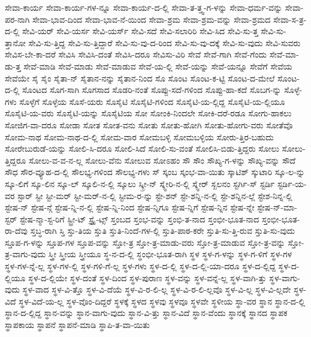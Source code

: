 {ಸೇವಾ-ಕಾರ್ಯ
ಸೇವಾ-ಕಾರ್ಯ-ಗಳ-ನ್ನೂ
ಸೇವಾ-ಕಾರ್ಯ-ದ-ಲ್ಲಿ
ಸೇವಾ-ತ-ತ್ತ್ವ-ಗ-ಳನ್ನು
ಸೇವಾ-ಧರ್ಮ-ವನ್ನು
ಸೇವಾ-ಪರ-ನಾಗಿ
ಸೇವಾ-ಭಾವ-ದಿಂದ
ಸೇವಾ-ಭಾವ-ನೆ-ಯಿಂದ
ಸೇವಾ-ಶ್ರಮ
ಸೇವಾ-ಶ್ರಮ-ವನ್ನು
ಸೇವಾ-ಶ್ರಮದ
ಸೇವಾ-ಸ-ತ್ರ-ದ-ಲ್ಲಿ
ಸೇವಿ-ಯರ್
ಸೇವಿ-ಯರ್ಸ
ಸೇವಿ-ಯರ್ಸ್
ಸೇವಿ-ಸದೆ
ಸೇವಿ-ಸಲಾರಿರಿ
ಸೇವಿ-ಸಿದ
ಸೇವಿ-ಸು-ತ್ತ
ಸೇವಿ-ಸು-ತ್ತಾನೋ
ಸೇವಿ-ಸು-ತ್ತಿದ್ದ
ಸೇವಿ-ಸು-ತ್ತಿದ್ದಾರೆ
ಸೇವಿ-ಸು-ವು-ದ-ರಿಂದ
ಸೇವಿ-ಸು-ವು-ದಕ್ಕೆ
ಸೇವಿ-ಸು-ವುದು
ಸೇವಿ-ಸುವರು
ಸೇವಿಸ-ಬೇ-ಕಾ-ದರೆ
ಸೇವಿಸಿ
ಸೇವಿಸಿ-ದಂತೆ
ಸೇವಿಸಿ-ದರೂ
ಸೇವಿಸು-ವಿರಿ
ಸೇವೆ
ಸೇವೆ-ಗಾಗಿ
ಸೇವೆ-ಗೆಂದು
ಸೇವೆ-ಮಾ-ಡು-ತ್ತ
ಸೇವೆ-ಮಾಡಿ
ಸೇವೆ-ಮಾಡು
ಸೇವೆ-ಮಾಡುವ
ಸೇವೆ-ಯ-ಲ್ಲಿ
ಸೇವೆ-ಯನ್ನು
ಸೇವೆ-ಯನ್ನೂ
ಸೇವೆಗೆ
ಸೇವೆಯ
ಸೇವೆಯೇ
ಸೈ
ಸೈಂ
ಸೈತಾ-ನ್
ಸೈತಾನ-ನನ್ನು
ಸೈತಾನ-ನಿಂದ
ಸೊ
ಸೊಂಟ
ಸೊಂಟ-ಕ-ಟ್ಟಿ
ಸೊಂಟ-ದ-ಮೇಲೆ
ಸೊಂಟ-ದ-ಲ್ಲಿ
ಸೊಂಟದ
ಸೊಗ-ಸಾಗಿ
ಸೊಗಸಾದ
ಸೊಡರಿ-ನಂತೆ
ಸೊಪ್ಪು-ಸದೆ-ಗಳಿಂದ
ಸೊಪ್ಪು-ಹಾ-ಕದೆ
ಸೊಬಗ-ನ್ನು
ಸೊಳ್ಳೆ-ಗಳು
ಸೊಳ್ಳೆಗೆ
ಸೊಳ್ಳೆಯ
ಸೊಸೆ-ಯರು
ಸೊಸೈಟಿ
ಸೊಸೈಟಿ-ಗಳಿಂದ
ಸೊಸೈಟಿ-ಯ-ಲ್ಲಿದ್ದ
ಸೊಸೈಟಿ-ಯ-ಲ್ಲಿಯೂ
ಸೊಸೈಟಿ-ಯ-ವರು
ಸೊಸೈಟಿ-ಯನ್ನು
ಸೊಸೈಟಿಯ
ಸೋ
ಸೋಂಕಿ-ನಿಂದಲೇ
ಸೋಕಿ-ದರೆ-ರಡೂ
ಸೋಗು-ಹಾಕಲು
ಸೋಜಿಗ-ವಾ-ದರೂ
ಸೋಡಾ
ಸೋತ
ಸೋತ-ವನು
ಸೋತು
ಸೋತು-ಹೋಗಿ
ಸೋತು-ಹೋಗು-ವರು
ಸೋತೆವೊ
ಸೋಮ-ನಾಥ
ಸೋಮ-ನಾಥ-ದ-ಲ್ಲಿ
ಸೋಮ-ವಾರ
ಸೋಮಬಳ್ಳಿ
ಸೋಮಬಳ್ಳಿಯ
ಸೋರು-ತ್ತಿರ-ಬಹುದು
ಸೋರೇಬುರುಡೆ-ಯನ್ನು
ಸೋಲಿ-ಸಿ-ದರೂ
ಸೋಲಿ-ಸಿದೆ
ಸೋಲಿ-ಸು-ವಂತೆ
ಸೋಲಿಸಿ-ಬಿಡು-ತ್ತಿದ್ದರು
ಸೋಲು
ಸೋಲು-ತ್ತಿದ್ದರೂ
ಸೋಲು-ವ-ವ-ನ-ಲ್ಲ
ಸೋಲು-ವೆನು
ಸೋಲುವ
ಸೋಽಹಂ
ಸೌ
ಸೌಂ
ಸೌಖ್ಯ-ಗ-ಳನ್ನು
ಸೌಖ್ಯ-ವನ್ನು
ಸೌದೆ
ಸೌಧ
ಸೌರ-ವ್ಯೂಹ-ದ-ಲ್ಲಿ
ಸೌಲಭ್ಯ-ಗಳಿಂದ
ಸೌಲಭ್ಯ-ಗಳು
ಸ್
ಸ್ಕಂಬ
ಸ್ಕಂಭ-ವಾ-ಯಿತು
ಸ್ಕಾಟಿಶ್
ಸ್ಕುಟಾರಿ
ಸ್ಕೂ-ಲ-ನ್ನು
ಸ್ಕೂ-ಲಿಗೆ
ಸ್ಕೂ-ಲಿನ
ಸ್ಕೂ-ಲ್
ಸ್ಕೂಲಿ-ನ-ಲ್ಲಿ
ಸ್ಕೂಲು
ಸ್ಕ್ರೀ-ನ್
ಸ್ಕ್ವೇರಿ-ನ-ಲ್ಲಿ
ಸ್ಕ್ವೇರ್
ಸ್ಖಲನಂ
ಸ್ಟರ್ಗಿ-ಸ್
ಸ್ಟರ್ಡಿ
ಸ್ಟರ್ಡಿ-ಯ-ವರ
ಸ್ಟಾರ್
ಸ್ಟೀ
ಸ್ಟೀ-ಮರ್
ಸ್ಟೀ-ಮರ್-ನ-ಲ್ಲಿ
ಸ್ಟೀಮ-ರ-ನ್ನು
ಸ್ಟೇ-ಶನ್
ಸ್ಟೇ-ಶನ್ನಿ-ನ-ಲ್ಲಿ
ಸ್ಟೇ-ಶನ್ನಿನ-ಲ್ಲೆ
ಸ್ಟೇಶ-ನಿನ್ನ-ಲ್ಲಿ
ಸ್ಟೇಷ-ನ್
ಸ್ಟೇಷ-ನ್ಗೆ
ಸ್ಟೇಷ-ನ್ನಿ-ನ-ಲ್ಲಿ
ಸ್ಟೇಷ-ನ್ನಿ-ನಿಂದ
ಸ್ಟೇಷ-ನ್ನಿಗೂ
ಸ್ಟೇಷ-ನ್ನಿಗೆ
ಸ್ಟೇಷ-ನ್ನಿನ
ಸ್ಟೇಷ-ನ್ನೇ
ಸ್ಟೇಷ-ನ್-ಮಾ-ಸ್ಟರ್
ಸ್ಟೇಷ-ನ್ಮಾ-ಸ್ಟ-ರಿಗೆ
ಸ್ಟ್ರೀ-ಟ್
ಸ್ಟ್ರೈ-ಟ್ಸ್
ಸ್ತಂಬದ
ಸ್ತಂಭ-ವನ್ನು
ಸ್ತಂಭಿ-ತ-ನಾದ
ಸ್ತಂಭೀ-ಭೂತ-ನಾದ
ಸ್ತಂಭೀ-ಭೂತ-ರಾ-ದೆವು
ಸ್ತಬ್ಧ-ರಾಗಿ
ಸ್ತಿ
ಸ್ತು-ತಿಯ
ಸ್ತುತಿ
ಸ್ತುತಿ-ನಿಂದೆ-ಗಳ-ಲ್ಲಿ
ಸ್ತುತಿ-ಪಾಠ-ಕರೇ
ಸ್ತುತಿ-ಸು-ತ್ತಿ-ರುವ
ಸ್ತುತಿ-ಸು-ವುದು
ಸ್ತೂಪ-ಗ-ಳನ್ನು
ಸ್ತೂಪ-ಗಳ
ಸ್ತೂಪ-ವನ್ನು
ಸ್ತೋ-ತ್ರ
ಸ್ತೋ-ತ್ರ-ಮಾಡು-ವರು
ಸ್ತೋ-ತ್ರ-ಮಾಡುವ
ಸ್ತೋ-ತ್ರ-ವನ್ನು
ಸ್ತೋ-ತ್ರ-ವಾಗು-ವುದು
ಸ್ತ್ರೀ
ಸ್ತ್ರೀಯ
ಸ್ತ್ರೀಯೂ
ಸ್ಥ-ನ-ದ-ಲ್ಲಿ
ಸ್ಥಂಭೀ-ಭೂತ-ರಾಗಿ
ಸ್ಥಳ
ಸ್ಥಳ-ಗ-ಳನ್ನು
ಸ್ಥಳ-ಗ-ಳಿಗೆ
ಸ್ಥಳ-ಗಳ
ಸ್ಥಳ-ಗಳ-ನ್ನೆ-ಲ್ಲ
ಸ್ಥಳ-ಗಳ-ಲ್ಲಿ
ಸ್ಥಳ-ಗಳಿ-ಗೆ-ಲ್ಲ
ಸ್ಥಳ-ಗಳು
ಸ್ಥಳ-ದ-ಲ್ಲಿ
ಸ್ಥಳ-ದ-ಲ್ಲಿ-ಯಾ-ದರೂ
ಸ್ಥಳ-ದ-ಲ್ಲಿದ್ದ
ಸ್ಥಳ-ದ-ಲ್ಲಿಯೂ
ಸ್ಥಳ-ದ-ಲ್ಲಿಯೇ
ಸ್ಥಳ-ದಂತೆ
ಸ್ಥಳ-ದಿಂದ
ಸ್ಥಳ-ಪುರಾಣ
ಸ್ಥಳ-ವನ್ನು
ಸ್ಥಳ-ವನ್ನೆ-ಲ್ಲ
ಸ್ಥಳ-ವಾಗಿ-ತ್ತು
ಸ್ಥಳ-ವಾಗು-ವುದು
ಸ್ಥಳ-ವಾದ
ಸ್ಥಳ-ವಿ-ತ್ತೊ
ಸ್ಥಳ-ವಿ-ದೆಯೆ
ಸ್ಥಳ-ವಿ-ರ-ಲಿ-ಲ್ಲ
ಸ್ಥಳ-ವಿ-ರ-ಲಿ-ಲ್ಲವೊ
ಸ್ಥಳ-ವಿ-ಲ್ಲ
ಸ್ಥಳ-ವಿ-ಲ್ಲದೇ
ಸ್ಥಳ-ವಿದೆ
ಸ್ಥಳ-ವಿದೆ-ಯ-ಲ್ಲ
ಸ್ಥಳ-ವೊಂ-ದಿದ್ದರೆ
ಸ್ಥಳಕ್ಕೆ
ಸ್ಥಳದ
ಸ್ಥಳವು
ಸ್ಥಳವೂ
ಸ್ಥಳವೇ
ಸ್ಥಳೀಯ
ಸ್ಥಾ-ವರ
ಸ್ಥಾನ
ಸ್ಥಾನ-ದ-ಲ್ಲಿ
ಸ್ಥಾನ-ದ-ಲ್ಲಿದ್ದ
ಸ್ಥಾನ-ವನ್ನು
ಸ್ಥಾನ-ವಾಗು-ವುದು
ಸ್ಥಾನ-ವಿ-ತ್ತು
ಸ್ಥಾನ-ವಿದೆ
ಸ್ಥಾನ-ವೆಂದು
ಸ್ಥಾನಕ್ಕೆ
ಸ್ಥಾನದ
ಸ್ಥಾಪಕ
ಸ್ಥಾಪಕಾಯ
ಸ್ಥಾಪನೆ
ಸ್ಥಾಪನೆ-ಮಾಡಿ
ಸ್ಥಾಪಿ-ತ-ವಾ-ಯಿತು
}
